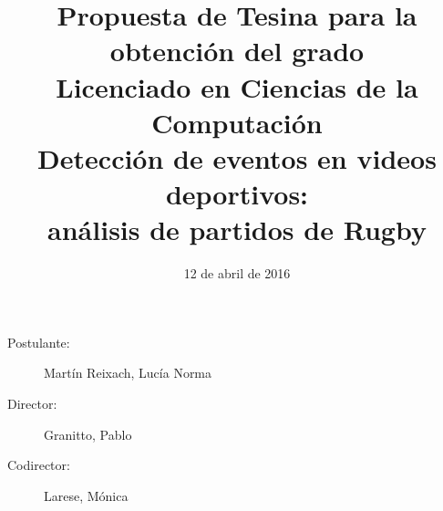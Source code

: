 \documentclass[11pt]{article}
\begin{document}
\date{12 de abril de 2016}
\title{Propuesta de Tesina para la obtención del grado \\ Licenciado en Ciencias de la Computación
\\ Detección de eventos en videos deportivos: \\ análisis de partidos de Rugby}
\maketitle

\begin{description}
  \item[Postulante:] Martín Reixach, Lucía Norma
  \item[Director:] Granitto, Pablo
  \item[Codirector:] Larese, Mónica
\end{description}











\nocite{yang2007evaluating}
\printbibliography

%
\end{document}
